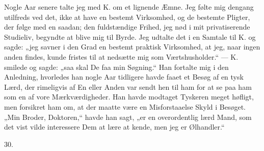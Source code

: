 \documentclass[12pt,a4paper,openany]{book}
\newcommand{\secnum}[1]{\par\begin{center}#1\end{center}\par\nobreak}
\newcommand{\opage}[1]{\marginnote{\footnotesize\textit{[#1]}}}
\begin{document}
Nogle Aar senere talte jeg med K. om et lignende
Æmne. Jeg følte mig dengang utilfreds ved det, ikke
at have en bestemt Virksomhed, og de bestemte Pligter,
der følge med en saadan; den fuldstændige Frihed, jeg
nød i mit privatiserende Studieliv, begyndte at blive mig
til Byrde. Jeg udtalte det i en Samtale til K. og sagde:
„jeg savner i den Grad en bestemt praktisk Virksomhed,
\opage{358}at jeg, naar ingen anden findes, kunde fristes til at nedsætte
mig som Værtshusholder.“ — K. smilede og sagde:
„saa skal De faa min Søgning.“ Han fortalte mig i den
Anledning, hvorledes han nogle Aar tidligere havde faaet
et Besøg af en tysk Lærd, der rimeligvis af En eller
Anden var sendt hen til ham for at se paa ham som en
af vore Mærkværdigheder. Han havde modtaget Tyskeren
meget høfligt, men forsikret ham om, at der maatte være
en Misforstaaelse Skyld i Besøget. „Min Broder, Doktoren,“
havde han sagt, „er en overordentlig lærd Mand,
som det vist vilde interessere Dem at lære at kende,
men jeg er Ølhandler.“

\secnum{30.}
\end{document}

